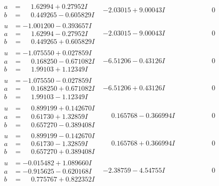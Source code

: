 \documentclass[1p]{elsarticle_modified}
\theoremstyle{definition}
\begin{document}
$$\begin{array}{c|c|c}
\begin{aligned}
a &= \phantom{-}1.62994 + 0.27952 I \\
b &= \phantom{-}0.449265 - 0.605829 I\end{aligned}
 & -2.03015 + 9.00043 I & \phantom{-0.000000 } 0 \\ \hline\begin{aligned}
u &= -1.001200 - 0.393657 I \\
a &= \phantom{-}1.62994 - 0.27952 I \\
b &= \phantom{-}0.449265 + 0.605829 I\end{aligned}
 & -2.03015 - 9.00043 I & \phantom{-0.000000 } 0 \\ \hline\begin{aligned}
u &= -1.075550 + 0.027859 I \\
a &= \phantom{-}0.168250 - 0.671082 I \\
b &= \phantom{-}1.99103 + 1.12349 I\end{aligned}
 & -6.51206 - 0.43126 I & \phantom{-0.000000 } 0 \\ \hline\begin{aligned}
u &= -1.075550 - 0.027859 I \\
a &= \phantom{-}0.168250 + 0.671082 I \\
b &= \phantom{-}1.99103 - 1.12349 I\end{aligned}
 & -6.51206 + 0.43126 I & \phantom{-0.000000 } 0 \\ \hline\begin{aligned}
u &= \phantom{-}0.899199 + 0.142670 I \\
a &= \phantom{-}0.61730 + 1.32859 I \\
b &= \phantom{-}0.657270 - 0.389408 I\end{aligned}
 & \phantom{-}0.165768 - 0.366994 I & \phantom{-0.000000 } 0 \\ \hline\begin{aligned}
u &= \phantom{-}0.899199 - 0.142670 I \\
a &= \phantom{-}0.61730 - 1.32859 I \\
b &= \phantom{-}0.657270 + 0.389408 I\end{aligned}
 & \phantom{-}0.165768 + 0.366994 I & \phantom{-0.000000 } 0 \\ \hline\begin{aligned}
u &= -0.015482 + 1.089660 I \\
a &= -0.915625 - 0.620168 I \\
b &= \phantom{-}0.775767 + 0.822352 I\end{aligned}
 & -2.38759 - 4.54755 I & \phantom{-0.000000 } 0 \\ \hline\begin{aligned}

\end{aligned}
\end{array}$$
\end{document}
